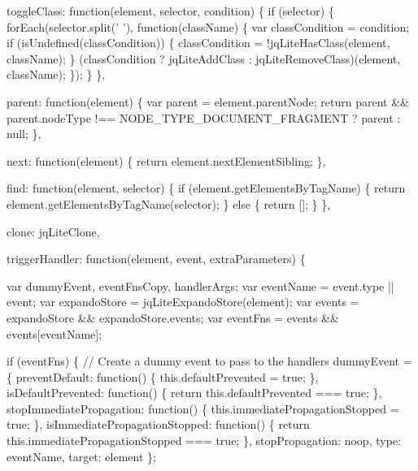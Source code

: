 \begin{DoxyCodeInclude}
{  toggleClass: \textcolor{keyword}{function}(element, selector, condition) \{
    \textcolor{keywordflow}{if} (selector) \{
      forEach(selector.split(\textcolor{charliteral}{' '}), \textcolor{keyword}{function}(className) \{
        var classCondition = condition;
        \textcolor{keywordflow}{if} (isUndefined(classCondition)) \{
          classCondition = !jqLiteHasClass(element, className);
        \}
        (classCondition ? jqLiteAddClass : jqLiteRemoveClass)(element, className);
      \});
    \}
  \},

  parent: \textcolor{keyword}{function}(element) \{
    var parent = element.parentNode;
    \textcolor{keywordflow}{return} parent && parent.nodeType !== NODE\_TYPE\_DOCUMENT\_FRAGMENT ? parent : null;
  \},

  next: \textcolor{keyword}{function}(element) \{
    \textcolor{keywordflow}{return} element.nextElementSibling;
  \},

  find: \textcolor{keyword}{function}(element, selector) \{
    \textcolor{keywordflow}{if} (element.getElementsByTagName) \{
      \textcolor{keywordflow}{return} element.getElementsByTagName(selector);
    \} \textcolor{keywordflow}{else} \{
      \textcolor{keywordflow}{return} [];
    \}
  \},

  clone: jqLiteClone,

  triggerHandler: \textcolor{keyword}{function}(element, event, extraParameters) \{

    var dummyEvent, eventFnsCopy, handlerArgs;
    var eventName = \textcolor{keyword}{event}.type || event;
    var expandoStore = jqLiteExpandoStore(element);
    var events = expandoStore && expandoStore.events;
    var eventFns = events && events[eventName];

    \textcolor{keywordflow}{if} (eventFns) \{
      \textcolor{comment}{// Create a dummy event to pass to the handlers}
      dummyEvent = \{
        preventDefault: \textcolor{keyword}{function}() \{ this.defaultPrevented = \textcolor{keyword}{true}; \},
        isDefaultPrevented: \textcolor{keyword}{function}() \{ \textcolor{keywordflow}{return} this.defaultPrevented === \textcolor{keyword}{true}; \},
        stopImmediatePropagation: \textcolor{keyword}{function}() \{ this.immediatePropagationStopped = \textcolor{keyword}{true}; \},
        isImmediatePropagationStopped: \textcolor{keyword}{function}() \{ \textcolor{keywordflow}{return} this.immediatePropagationStopped === \textcolor{keyword}{true}; \},
        stopPropagation: noop,
        type: eventName,
        target: element
      \};

}
\end{DoxyCodeInclude}
